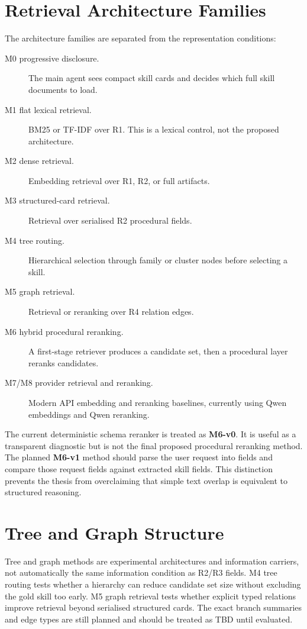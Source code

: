 \section{Retrieval Architecture Families}

The architecture families are separated from the representation conditions:

\begin{description}
  \item[M0 progressive disclosure.] The main agent sees compact skill cards and decides which full skill documents to load.
  \item[M1 flat lexical retrieval.] BM25 or TF-IDF over R1. This is a lexical control, not the proposed architecture.
  \item[M2 dense retrieval.] Embedding retrieval over R1, R2, or full artifacts.
  \item[M3 structured-card retrieval.] Retrieval over serialised R2 procedural fields.
  \item[M4 tree routing.] Hierarchical selection through family or cluster nodes before selecting a skill.
  \item[M5 graph retrieval.] Retrieval or reranking over R4 relation edges.
  \item[M6 hybrid procedural reranking.] A first-stage retriever produces a candidate set, then a procedural layer reranks candidates.
  \item[M7/M8 provider retrieval and reranking.] Modern API embedding and reranking baselines, currently using Qwen embeddings and Qwen reranking.
\end{description}

The current deterministic schema reranker is treated as \textbf{M6-v0}. It is useful as a transparent diagnostic but is not the final proposed procedural reranking method. The planned \textbf{M6-v1} method should parse the user request into fields and compare those request fields against extracted skill fields. This distinction prevents the thesis from overclaiming that simple text overlap is equivalent to structured reasoning.

\section{Tree and Graph Structure}

Tree and graph methods are experimental architectures and information carriers, not automatically the same information condition as R2/R3 fields. M4 tree routing tests whether a hierarchy can reduce candidate set size without excluding the gold skill too early. M5 graph retrieval tests whether explicit typed relations improve retrieval beyond serialised structured cards. The exact branch summaries and edge types are still planned and should be treated as TBD until evaluated.

